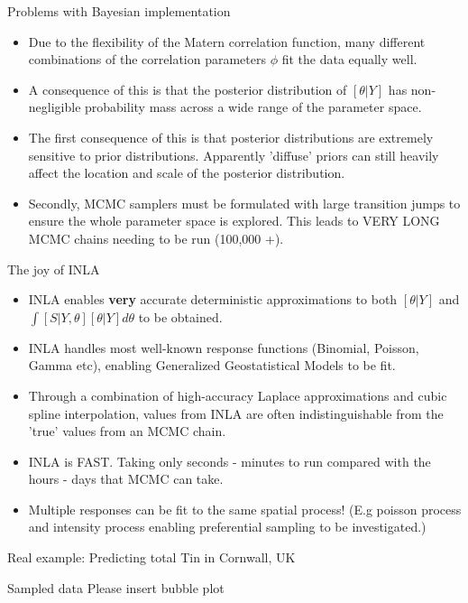 \documentclass{beamer}
\begin{document}
\begin{frame}{Problems with Bayesian implementation}

\begin{itemize}
\item Due to the flexibility of the Matern correlation function, many different combinations of the correlation parameters $\phi$ fit the data equally well.
\item A consequence of this is that the posterior distribution of $[\theta | Y]$ has non-negligible probability mass across a wide range of the parameter space.
\item The first consequence of this is that posterior distributions are extremely sensitive to prior distributions. Apparently 'diffuse' priors can still heavily affect the location and scale of the posterior distribution.
\item Secondly, MCMC samplers must be formulated with large transition jumps to ensure the whole parameter space is explored. This leads to VERY LONG MCMC chains needing to be run (100,000 +).
\end{itemize}

\end{frame}

\begin{frame}{The joy of INLA}

\begin{itemize}
\item INLA enables \textbf{very} accurate deterministic approximations to both $[\theta | Y]$ and $\int [S | Y, \theta ] [ \theta | Y ] d \theta$ to be obtained.
\item INLA handles most well-known response functions (Binomial, Poisson, Gamma etc), enabling Generalized Geostatistical Models to be fit.
\item Through a combination of high-accuracy Laplace approximations and cubic spline interpolation, values from INLA are often indistinguishable from the 'true' values from an MCMC chain.
\item INLA is FAST. Taking only seconds - minutes to run compared with the hours - days that MCMC can take. 
\item Multiple responses can be fit to the same spatial process! (E.g poisson process and intensity process enabling preferential sampling to be investigated.)
\end{itemize}

\end{frame}

\begin{frame}{Real example: Predicting total Tin in Cornwall, UK}
\begin{block}{Sampled data}
Please insert bubble plot
\end{block}

\end{frame}
\end{document}
